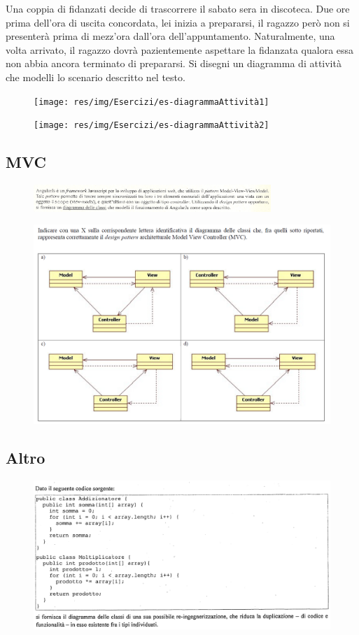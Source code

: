 Una coppia di fidanzati decide di trascorrere il sabato sera in discoteca. Due ore prima dell'ora di uscita concordata, lei
inizia a prepararsi, il ragazzo però non si presenterà prima di mezz'ora dall'ora dell'appuntamento. Naturalmente, una
volta arrivato, il ragazzo dovrà pazientemente aspettare la fidanzata qualora essa non abbia ancora terminato di prepararsi.
Si disegni un diagramma di attività che modelli lo scenario descritto nel testo.

\begin{figure}
\texttt{[image: res/img/Esercizi/es-diagrammaAttività1]}
\end{figure}

\begin{figure}
\texttt{[image: res/img/Esercizi/es-diagrammaAttività2]}
\end{figure}

\subsection{MVC}

\begin{figure}
\includegraphics[width=0.8\textwidth]{res/img/Esercizi/es-angular}
\end{figure}

\begin{figure}
\includegraphics[width=1\textwidth]{res/img/Esercizi/es-mvc}
\end{figure}

\subsection{Altro}
\begin{figure}
\includegraphics[width=1\textwidth]{res/img/Esercizi/es-codice}
\end{figure}
